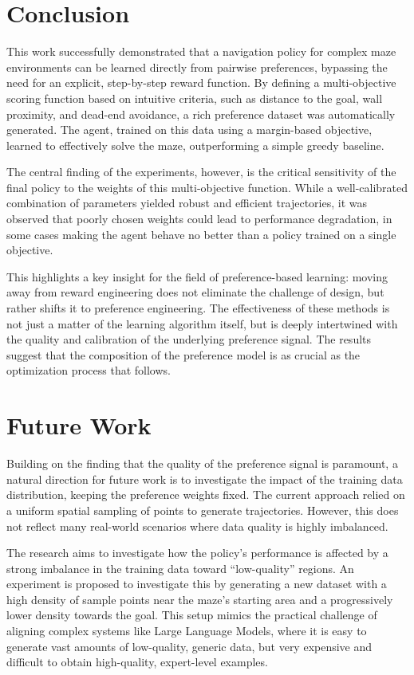 \documentclass[a4paper,oneside,10pt,ngerman,english]{scrartcl}
\begin{document}
\section{Conclusion}
\label{sec:conclusion}

This work successfully demonstrated that a navigation policy for complex maze environments can be learned directly from pairwise preferences, bypassing the need for an explicit, step-by-step reward function. By defining a multi-objective scoring function based on intuitive criteria, such as distance to the goal, wall proximity, and dead-end avoidance, a rich preference dataset was automatically generated. The agent, trained on this data using a margin-based objective, learned to effectively solve the maze, outperforming a simple greedy baseline.

The central finding of the experiments, however, is the critical sensitivity of the final policy to the weights of this multi-objective function. While a well-calibrated combination of parameters yielded robust and efficient trajectories, it was observed that poorly chosen weights could lead to performance degradation, in some cases making the agent behave no better than a policy trained on a single objective.

This highlights a key insight for the field of preference-based learning: moving away from reward engineering does not eliminate the challenge of design, but rather shifts it to preference engineering. The effectiveness of these methods is not just a matter of the learning algorithm itself, but is deeply intertwined with the quality and calibration of the underlying preference signal. The results suggest that the composition of the preference model is as crucial as the optimization process that follows.

\section{Future Work}
\label{sec:futurework}

Building on the finding that the quality of the preference signal is paramount, a natural direction for future work is to investigate the impact of the training data distribution, keeping the preference weights fixed. The current approach relied on a uniform spatial sampling of points to generate trajectories. However, this does not reflect many real-world scenarios where data quality is highly imbalanced.

The research aims to investigate how the policy’s performance is affected by a strong imbalance in the training data toward “low-quality” regions. An experiment is proposed to investigate this by generating a new dataset with a high density of sample points near the maze's starting area and a progressively lower density towards the goal. This setup mimics the practical challenge of aligning complex systems like Large Language Models, where it is easy to generate vast amounts of low-quality, generic data, but very expensive and difficult to obtain high-quality, expert-level examples.
\end{document}
